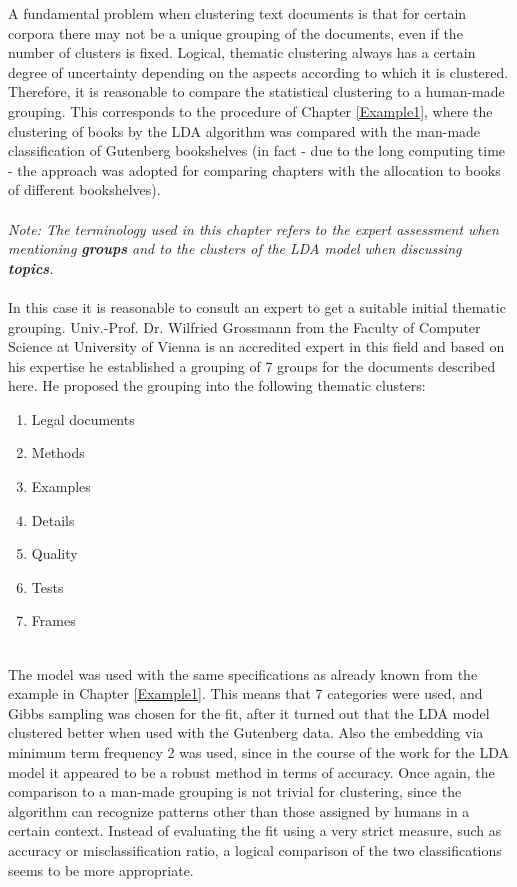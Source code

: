 \documentclass[11pt,a4paper]{article}
\begin{document}
A fundamental problem when clustering text documents is that for certain corpora there may not be a unique grouping of the documents, even if the number of clusters is fixed. Logical, thematic clustering always has a certain degree of uncertainty depending on the aspects according to which it is clustered. Therefore, it is reasonable to compare the statistical clustering to a human-made grouping. This corresponds to the procedure of Chapter \ref{Example1}, where the clustering of books by the LDA algorithm was compared with the man-made classification of Gutenberg bookshelves (in fact - due to the long computing time - the approach was adopted for comparing chapters with the allocation to books of different bookshelves).\\
\ \\
\textit{Note: The terminology used in this chapter refers to the expert assessment when mentioning \textbf{groups} and to the clusters of the LDA model when discussing \textbf{topics}.}\\
\ \\
In this case it is reasonable to consult an expert to get a suitable initial thematic grouping. Univ.-Prof. Dr. Wilfried Grossmann from the Faculty of Computer Science at University of Vienna is an accredited expert in this field and based on his expertise he established a grouping of 7 groups for the documents described here. He proposed the grouping into the following thematic clusters: 
\begin{enumerate}
	\item Legal documents
	\item Methods
	\item Examples
	\item Details
	\item Quality
	\item Tests
	\item Frames
\end{enumerate}
\ \\
The model was used with the same specifications as already known from the example in Chapter \ref{Example1}. This means that 7 categories were used, and Gibbs sampling was chosen for the fit, after it turned out that the LDA model clustered better when used with the Gutenberg data. Also the embedding via minimum term frequency 2 was used, since in the course of the work for the LDA model it appeared to be a robust method in terms of accuracy. Once again, the comparison to a man-made grouping is not trivial for clustering, since the algorithm can recognize patterns other than those assigned by humans in a certain context. Instead of evaluating the fit using a very strict measure, such as accuracy or misclassification ratio, a logical comparison of the two classifications seems to be more appropriate.\\
\end{document}
